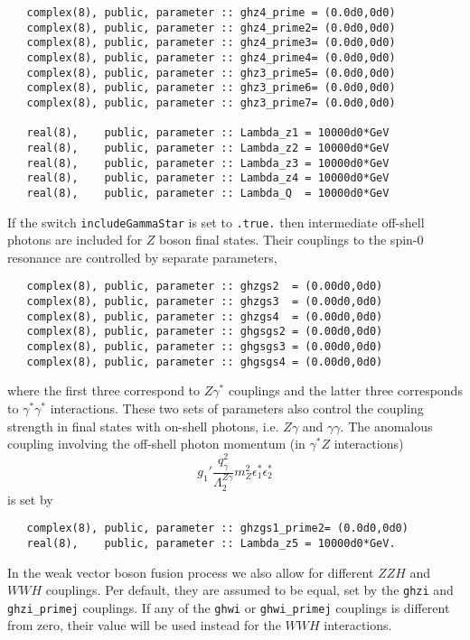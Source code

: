 \documentclass[aps,superscriptaddress,nofootinbib]{revtex4}
\begin{document}
\begin{verbatim}
   complex(8), public, parameter :: ghz4_prime = (0.0d0,0d0)
   complex(8), public, parameter :: ghz4_prime2= (0.0d0,0d0)
   complex(8), public, parameter :: ghz4_prime3= (0.0d0,0d0)
   complex(8), public, parameter :: ghz4_prime4= (0.0d0,0d0)
   complex(8), public, parameter :: ghz3_prime5= (0.0d0,0d0)
   complex(8), public, parameter :: ghz3_prime6= (0.0d0,0d0)
   complex(8), public, parameter :: ghz3_prime7= (0.0d0,0d0)

   real(8),    public, parameter :: Lambda_z1 = 10000d0*GeV
   real(8),    public, parameter :: Lambda_z2 = 10000d0*GeV
   real(8),    public, parameter :: Lambda_z3 = 10000d0*GeV
   real(8),    public, parameter :: Lambda_z4 = 10000d0*GeV
   real(8),    public, parameter :: Lambda_Q  = 10000d0*GeV
\end{verbatim}

If the switch \verb|includeGammaStar| is set to \verb|.true.| then intermediate off-shell photons are included for $Z$ boson final states.
Their couplings to the spin-0 resonance are controlled by separate parameters,
\begin{verbatim}
   complex(8), public, parameter :: ghzgs2  = (0.00d0,0d0)
   complex(8), public, parameter :: ghzgs3  = (0.00d0,0d0)
   complex(8), public, parameter :: ghzgs4  = (0.00d0,0d0)
   complex(8), public, parameter :: ghgsgs2 = (0.00d0,0d0)
   complex(8), public, parameter :: ghgsgs3 = (0.00d0,0d0)
   complex(8), public, parameter :: ghgsgs4 = (0.00d0,0d0)
\end{verbatim}
where the first three correspond to $Z\gamma^*$ couplings and the latter three corresponds to $\gamma^* \gamma^*$ interactions.
These two sets of parameters also control the coupling strength in final states with on-shell photons, i.e. $Z\gamma$ and $\gamma\gamma$.
The anomalous coupling involving the off-shell photon momentum (in $\gamma^* Z$ interactions)
\[
g_1' \frac{ q^2_\gamma }{ \Lambda_2^{Z\gamma} } m_Z^2 \epsilon^*_1 \epsilon^*_2
\]
is set by
\begin{verbatim}
   complex(8), public, parameter :: ghzgs1_prime2= (0.0d0,0d0)
   real(8),    public, parameter :: Lambda_z5 = 10000d0*GeV.
\end{verbatim}

In the weak vector boson fusion process we also allow for different $ZZH$ and $WWH$ couplings.
Per default, they are assumed to be equal, set by the {\tt ghzi} and {\tt ghzi\_primej} couplings.
If any of the {\tt ghwi} or {\tt ghwi\_primej} couplings is different from zero,
their value will be used instead for the $WWH$ interactions.
\end{document}
